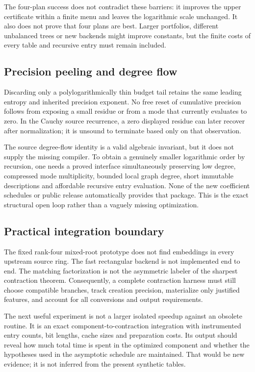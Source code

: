 \documentclass[11pt,letterpaper]{article}
\theoremstyle{remark}\newtheorem{remark}[theorem]{Remark}
\begin{document}
The four-plan success does not contradict these barriers: it improves the upper certificate within a finite menu and leaves the logarithmic scale unchanged. It also does not prove that four plans are best. Larger portfolios, different unbalanced trees or new backends might improve constants, but the finite costs of every table and recursive entry must remain included.

\subsection{Precision peeling and degree flow}
Discarding only a polylogarithmically thin budget tail retains the same leading entropy and inherited precision exponent. No free reset of cumulative precision follows from exposing a small residue or from a mode that currently evaluates to zero. In the Cauchy source recurrence, a zero displayed residue can later recover after normalization; it is unsound to terminate based only on that observation.

The source degree-flow identity is a valid algebraic invariant, but it does not supply the missing compiler. To obtain a genuinely smaller logarithmic order by recursion, one needs a proved interface simultaneously preserving low degree, compressed mode multiplicity, bounded local graph degree, short immutable descriptions and affordable recursive entry evaluation. None of the new coefficient schedules or public release automatically provides that package. This is the exact structural open loop rather than a vaguely missing optimization.

\subsection{Practical integration boundary}
The fixed rank-four mixed-root prototype does not find embeddings in every upstream source ring. The fast rectangular backend is not implemented end to end. The matching factorization is not the asymmetric labeler of the sharpest contraction theorem. Consequently, a complete contraction harness must still choose compatible branches, track creation precision, materialize only justified features, and account for all conversions and output requirements.

The next useful experiment is not a larger isolated speedup against an obsolete routine. It is an exact component-to-contraction integration with instrumented entry counts, bit lengths, cache sizes and preparation costs. Its output should reveal how much total time is spent in the optimized component and whether the hypotheses used in the asymptotic schedule are maintained. That would be new evidence; it is not inferred from the present synthetic tables.
\end{document}
